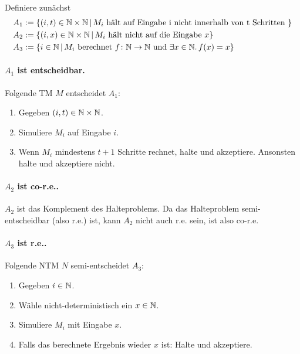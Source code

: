 
Definiere zunächst
\begin{align*}
	A_1 & := \{ (i,t) \in \mathbb{N} \times \mathbb{N} \,|\, M_i \text{ hält auf Eingabe
	i nicht innerhalb von t Schritten } \} \\
	A_2 & := \{ (i,x) \in \mathbb{N} \times \mathbb{N} \,|\, M_i \text{ hält nicht auf
	die Eingabe } x\} \\
	A_3 & := \{ i \in \mathbb{N} \,|\, M_i \text{ berechnet } f
	\colon \mathbb{N} \to \mathbb{N} \text{ und } \exists x \in
	\mathbb{N} .\, f(x) = x \}
\end{align*}

\paragraph{$A_1$ ist entscheidbar.}
Folgende TM $M$ entscheidet $A_1$:
\begin{enumerate}
	\item
		Gegeben $(i,t) \in \mathbb{N} \times \mathbb{N}$.
	\item
		Simuliere $M_i$ auf Eingabe $i$.
	\item
		Wenn $M_i$ mindestens $t+1$ Schritte rechnet, halte und
		akzeptiere. Ansonsten halte und akzeptiere nicht.
\end{enumerate}
\par

\paragraph{$A_2$ ist co-r.e..}
$A_2$ ist das Komplement des Halteproblems. Da das Halteproblem
semi-entscheidbar (also r.e.) ist, kann $A_2$ nicht auch r.e. sein, ist also
co-r.e.
\par

\paragraph{$A_3$ ist r.e..}
Folgende NTM $N$ semi-entscheidet $A_3$:
\begin{enumerate}
	\item
		Gegeben $i \in \mathbb{N}$.
	\item
		Wähle nicht-deterministisch ein $x \in \mathbb{N}$.
	\item
		Simuliere $M_i$ mit Eingabe $x$.
	\item
		Falls das berechnete Ergebnis wieder $x$ ist: Halte und
		akzeptiere.
\end{enumerate}
\par

